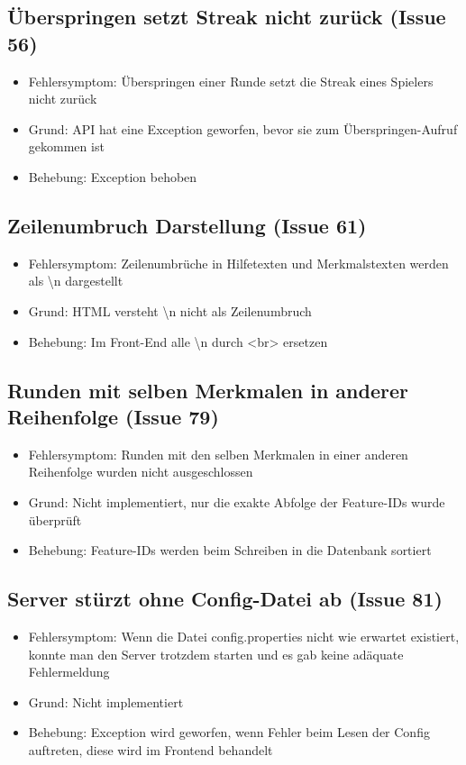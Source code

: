 \documentclass[a4paper]{scrreprt}
\begin{document}
    \subsection{Überspringen setzt Streak nicht zurück (Issue 56)}
    \begin{itemize}
        \item Fehlersymptom: Überspringen einer Runde setzt die Streak eines Spielers nicht zurück
        \item Grund: API hat eine Exception geworfen, bevor sie zum Überspringen-Aufruf gekommen ist
        \item Behebung: Exception behoben
    \end{itemize}

    \subsection{Zeilenumbruch Darstellung (Issue 61)}
    \begin{itemize}
    \item Fehlersymptom: Zeilenumbrüche in Hilfetexten und Merkmalstexten werden als \textbackslash n dargestellt
    \item Grund: HTML versteht \textbackslash n nicht als Zeilenumbruch
    \item Behebung: Im Front-End alle \textbackslash n durch <br> ersetzen
    \end{itemize}

    \subsection{Runden mit selben Merkmalen in anderer Reihenfolge (Issue 79)}
    \begin{itemize}
    \item Fehlersymptom: Runden mit den selben Merkmalen in einer anderen
     Reihenfolge wurden nicht ausgeschlossen
    \item Grund: Nicht implementiert, nur die exakte Abfolge der Feature-IDs wurde
     überprüft
    \item Behebung: Feature-IDs werden beim Schreiben in die Datenbank sortiert
    \end{itemize}

    \subsection{Server stürzt ohne Config-Datei ab (Issue 81)}
    \begin{itemize}
    \item Fehlersymptom: Wenn die Datei config.properties nicht wie erwartet
     existiert, konnte man den Server trotzdem starten und es gab keine
     adäquate Fehlermeldung
    \item Grund: Nicht implementiert
    \item Behebung: Exception wird geworfen, wenn Fehler beim Lesen der Config
     auftreten, diese wird im Frontend behandelt
    \end{itemize}
\end{document}
